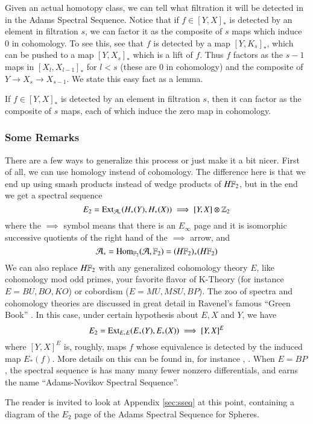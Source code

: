 Given an actual homotopy class, we can tell what filtration it will be detected in in the Adams Spectral Sequence.  Notice that if $f\in [Y,X]_*$ is detected by an element in filtration $s$, we can factor it as the composite of $s$ maps which induce 0 in cohomology.  
To see this, see that $f$ is detected by a map $[Y,K_s]_*$, which can be pushed to a map $[Y,X_s]_*$ which is a lift of $f$.  
Thus $f$ factors as the $s-1$ maps in $[X_{l}, X_{l-1}]_*$ for $l<s$ (these are 0 in cohomology) and the composite of $Y\to X_s\to X_{s-1}$.
We state this easy fact as a lemma.
\begin{Lemma}
  \label{sec:filtlemma}
  If $f\in [Y,X]_*$ is detected by an element in filtration $s$, then it can factor as the composite of $s$ maps, each of which induce the zero map in cohomology.
\end{Lemma}





\subsubsection{Some Remarks}

There are a few ways to generalize this process or just make it a bit nicer.
First of all, we can use homology instead of cohomology.  
The difference here is that we end up using smash products instead of wedge products of $H\mathbb{F}_2$, but in the end we get a spectral sequence
\[E_2 = \operatorname{Ext}\nolimits_{\mathcal{A}_*}(H_*(Y),H_*(X))\implies [Y,X]\otimes \mathbb{Z}_2\]
where the $\implies$ symbol means that there is an $E_\infty$ page and it is isomorphic successive quotients of the right hand of the $\implies$ arrow, and
\[\mathcal{A}_*=\operatorname{Hom}\nolimits_{\mathbb{F}_2}(\mathcal{A},\mathbb{F}_2)=(H\mathbb{F}_2)_*(H\mathbb{F}_2)\]
We can also replace $H\mathbb{F}_2$ with any generalized cohomology theory $E$, like cohomology mod odd primes, 
your favorite flavor of K-Theory (for instance $E=BU,BO,KO$) or cobordism ($E=MU,MSU,BP$).  
The zoo of spectra and cohomology theories are discussed in great detail in Ravenel's famous ``Green Book'' \cite{RavenelGreen}.
In this case, under certain hypothesis about $E,X$ and $Y$, we have
\[E_2 = \operatorname{Ext}\nolimits_{E_*E}(E_*(Y),E_*(X))\implies [Y,X]^{E}\]
where $[Y,X]^{E}$ is, roughly, maps $f$ whose equivalence is detected by the induced map $E_*(f)$.  
More details on this can be found in, for instance \cite{RavenelGreen}, \cite[Ch~IV]{H00RingSpectra}.  
When $E=BP$, the spectral sequence is has many many fewer nonzero differentials, and earns the name ``Adams-Novikov Spectral Sequence''.  

The reader is invited to look at Appendix \ref{sec:sseq} at this point, containing a diagram of the $E_2$ page of the Adams Spectral Sequence for Spheres.  

